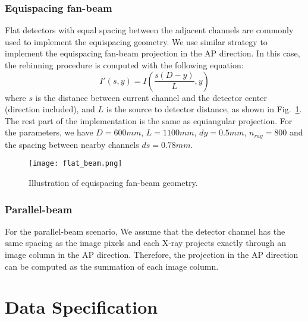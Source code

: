 \documentclass[journal,twoside,web]{ieeecolor}
\begin{document}
\subsubsection{Equispacing fan-beam}
Flat detectors with equal spacing between the adjacent channels are commonly used to implement the equispacing geometry. We use similar strategy to implement the equispacing fan-beam projection in the AP direction.
In this case, the rebinning procedure is computed with the following equation:
\begin{equation}
    I'(s, y)=I(\frac{s(D-y)}{L}, y)
    \label{eq:17}
\end{equation}
where \(s\) is the distance between current channel and the detector center (direction included), and \(L\) is the source to detector distance, as shown in Fig.~\ref{fig:9}. The rest part of the implementation is the same as equiangular projection. For the parameters, we have \(D=600mm\), \(L=1100mm\), \(dy=0.5mm\), \(n_{ray}=800\) and the spacing between nearby channels \(ds=0.78mm\). %

\begin{figure}[tb]
    \centering
        \texttt{[image: flat\_beam.png]}
        \caption{Illustration of equispacing fan-beam geometry. }
    \label{fig:9}
\end{figure}

\subsubsection{Parallel-beam}
For the parallel-beam scenario, We assume that the detector channel has the same spacing as the image pixels and each X-ray projects exactly through an image column in the AP direction. Therefore, the projection in the AP direction can be computed as the summation of each image column.

\section{Data Specification}
\end{document}
